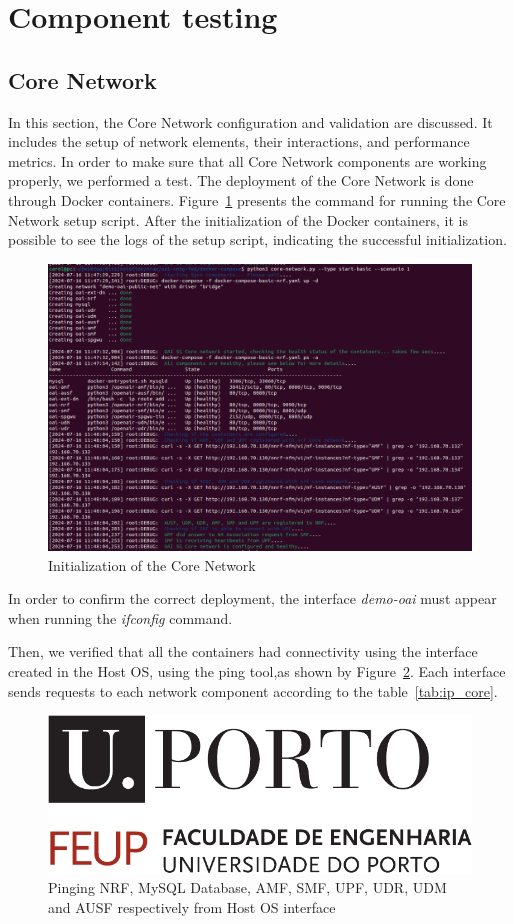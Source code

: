 \section{Component testing}\label{sec:component-testing}


\subsection{Core Network}\label{subsec:core_network}
In this section, the Core Network configuration and validation are discussed.
It includes the setup of network elements, their interactions, and performance metrics.
In order to make sure that all Core Network components are working properly, we performed a test.
The deployment of the Core Network is done through Docker containers.
Figure~\ref{fig:core_init} presents the command for running the Core Network setup script.
After the initialization of the Docker containers, it is possible to see the logs of the setup script, indicating the successful initialization.

\begin{figure}[H]
    \centering
    \includegraphics[width=0.5\linewidth]{figures/core_init}
    \caption[Initialization of the Core Network]{Initialization of the Core Network}
    \label{fig:core_init}
\end{figure}

In order to confirm the correct deployment, the interface \textit{demo-oai} must appear when running the \textit{ifconfig} command.

Then, we verified that all the containers had connectivity using the interface created in the Host OS, using the ping tool,as shown by Figure~\ref{fig:ping_core}.
Each interface sends requests to each network component according to the table~\ref{tab:ip_core}.

\begin{figure}[H]
\centering
\includegraphics[width=0.5\linewidth]{figures/uporto-feup}
\caption[Pinging NRF, MySQL Database, AMF, SMF, UPF, UDR, UDM and AUSF respectively from Host OS
interface]{Pinging NRF, MySQL Database, AMF, SMF, UPF, UDR, UDM and AUSF respectively from Host OS
interface}
\label{fig:ping_core}
\end{figure}


